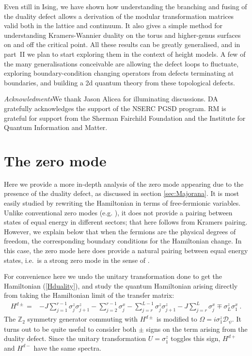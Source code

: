 \documentclass[11pt]{article}
\newcommand{\D}{{\mathcal{D}}}
\numberwithin{equation}{section}		%
\begin{document}
Even still in Ising, we have shown how understanding the branching and fusing of the duality defect allows a derivation of the modular transformation matrices valid both in the lattice and continuum. It also gives a simple method for understanding Kramers-Wannier duality on the torus and higher-genus surfaces on and off the critical point. All these results can be greatly generalised, and in part~II we plan to start exploring them in the context of height models. A few of the many generalisations conceivable are allowing the defect loops to fluctuate, exploring boundary-condition changing operators from defects terminating at boundaries, and building a 2d quantum theory from these topological defects.

\bigskip
{\it Acknowledments}\quad We thank Jason Alicea for illuminating discussions. DA gratefully acknowledges the support of the NSERC PGSD program.
RM is grateful for support from the Sherman Fairchild Foundation and the Institute for Quantum Information and Matter.


\appendix
\section{The zero mode}
\label{zero-mode}
Here we provide a more in-depth analysis of the zero mode appearing due to the presence of the duality defect, as discussed in section \ref{sec:Majorana}.
It is most easily studied by rewriting the Hamiltonian in terms of free-fermionic variables.
Unlike conventional zero modes (e.g. \cite{Kitaev2001}), it does not provide a pairing between states of equal energy in different sectors; that here follows from Kramers pairing. However, we explain below that when the fermions are the physical degrees of freedom, the corresponding boundary conditions for the Hamiltonian change. In this case, the zero mode here does provide a natural pairing between equal energy states, i.e.\ is a strong zero mode in the sense of \cite{Fendley2015}. 

For convenience here we undo the unitary transformation done to get the Hamiltonian (\ref{Hduality}), and study the quantum Hamiltonian arising directly from taking the Hamiltonian limit of the transfer matrix:
\begin{align}
H^{d\pm} =& - J\sum_{j=1}^{r-1}\sigma^z_j \sigma^z_{j+1} -\sum_{j =2}^{r-1}  \sigma^x_j
 -\sum_{j=r}^{L-1} \sigma^z_j \sigma^z_{j+1} - J\sum_{j=r}^{L} \sigma^x_j \mp \sigma_{L}^z \sigma_{1}^x\ .
 \label{Hduality1}
\end{align}
The ${\mathbb Z}_2$ symmetry generator commuting with $H^{d\pm}$ is modified to $\Omega=i\sigma^z_1\D_\psi$.
It turns out to be quite useful to consider both $\pm$ signs on the term arising from the duality defect. Since the unitary transformation $U=\sigma^z_1$ toggles this sign, $H^{d+}$ and $H^{d-}$ have the same spectra.
\end{document}
